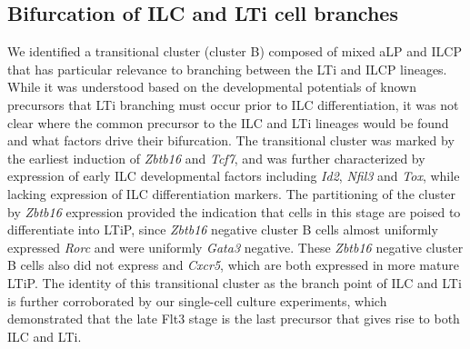 \subsection{Bifurcation of ILC and LTi cell branches}

We identified a transitional cluster (cluster B) composed of mixed aLP and ILCP that has particular relevance to branching between the LTi and ILCP lineages. While it was understood based on the developmental potentials of known precursors that LTi branching must occur prior to ILC differentiation, it was not clear where the common precursor to the ILC and LTi lineages would be found and what factors drive their bifurcation. The transitional cluster was marked by the earliest induction of \textit{Zbtb16} and \textit{Tcf7}, and was further characterized by expression of early ILC developmental factors including \textit{Id2}, \textit{Nfil3} and \textit{Tox}, while lacking expression of ILC differentiation markers. The partitioning of the cluster by \textit{Zbtb16} expression provided the indication that cells in this stage are poised to differentiate into LTiP, since \textit{Zbtb16} negative cluster B cells almost uniformly expressed \textit{Rorc} and were uniformly \textit{Gata3} negative. These \textit{Zbtb16} negative cluster B cells also did not express \textit{\Rora} and \textit{Cxcr5}, which are both expressed in more mature LTiP. The identity of this transitional cluster as the branch point of ILC and LTi is further corroborated by our single-cell culture experiments, which demonstrated that the late Flt3\UM{} \aLP stage is the last precursor that gives rise to both ILC and LTi. 

